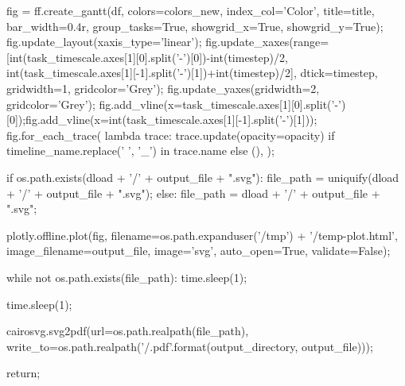 \documentclass[
	10pt,				%
	openright,			%
	oneside,			%
	a4paper,			%
	english,			%
	french,				%
	spanish,			%
	brazil,				%
	]{abntex2}
\newcommand{\ª}{%
\textordfeminine
}
\begin{document}
\begin{sagesilent}
    fig = ff.create_gantt(df, colors=colors_new, index_col='Color', title=title, bar_width=0.4r, group_tasks=True, showgrid_x=True, showgrid_y=True);
    fig.update_layout(xaxis_type='linear');
    fig.update_xaxes(range=[int(task_timescale.axes[1][0].split('-')[0])-int(timestep)/2, int(task_timescale.axes[1][-1].split('-')[1])+int(timestep)/2], dtick=timestep, gridwidth=1, gridcolor='Grey');
    fig.update_yaxes(gridwidth=2, gridcolor='Grey');
    fig.add_vline(x=task_timescale.axes[1][0].split('-')[0]);fig.add_vline(x=int(task_timescale.axes[1][-1].split('-')[1]));
    fig.for_each_trace(
        lambda trace: trace.update(opacity=opacity) if timeline_name.replace(' ', '_') in trace.name else (),
    );

    if os.path.exists(dload + '/' + output_file + ".svg"):
        file_path = uniquify(dload + '/' + output_file + ".svg");
    else:
        file_path = dload + '/' + output_file + ".svg";

    plotly.offline.plot(fig, filename=os.path.expanduser('/tmp') + '/temp-plot.html', image_filename=output_file, image='svg', auto_open=True, validate=False);

    while not os.path.exists(file_path):
        time.sleep(1);

    time.sleep(1);

    cairosvg.svg2pdf(url=os.path.realpath(file_path), write_to=os.path.realpath('{}/{}.pdf'.format(output_directory, output_file)));

    return;
\end{sagesilent}
\end{document}
